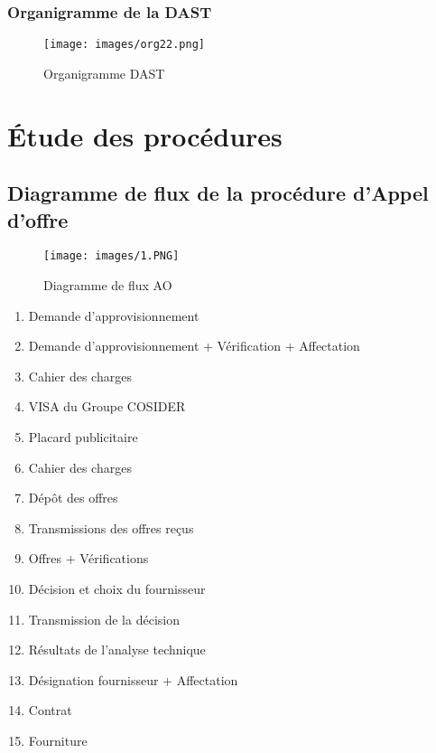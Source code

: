 \documentclass{report}
\begin{document}
\subsubsection{Organigramme de la DAST}
 \vspace*{0.7cm}
\begin{figure}[h]
        \centering
             \texttt{[image: images/org22.png]}
        \caption{Organigramme DAST}
 \end{figure}

\newpage
\section{Étude des procédures}

\subsection{Diagramme de flux de la procédure d’Appel d’offre}

\begin{figure}[h]
        \centering
            \texttt{[image: images/1.PNG]}
        \caption{Diagramme de flux AO}
 \end{figure}

\begin{enumerate}
    \item Demande d’approvisionnement
    \item Demande d’approvisionnement + Vérification + Affectation
    \item Cahier des charges
    \item VISA du Groupe COSIDER
    \item Placard publicitaire
    \item Cahier des charges
    \item Dépôt des offres
    \item Transmissions des offres reçus
    \item Offres + Vérifications
    \item Décision et choix du fournisseur
    \item Transmission de la décision
    \item Résultats de l'analyse technique
    \item Désignation fournisseur + Affectation
    \item Contrat
    \item Fourniture
\end{enumerate}
\end{document}
